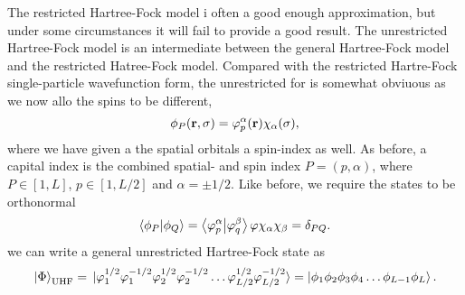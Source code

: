 The restricted Hartree-Fock model i often a good enough approximation, but under some 
circumstances it will fail to provide a good result. The unrestricted Hartree-Fock model 
is an intermediate between the general Hartree-Fock model and the restricted Hatree-Fock 
model. Compared with the restricted Hartre-Fock single-particle wavefunction form, the 
unrestricted for is somewhat obviuous as we now allo the spins to be different,
\begin{equation}
    \phi_P(\vb{r}, \sigma) = \varphi_p^{\alpha}(\vb{r})\chi_\alpha(\sigma),
\end{equation}
where we have given a the spatial orbitals a spin-index as well. As before, a capital index 
is the combined spatial- and spin index $P=(p,\alpha)$, where $P \in [1,L]$, $p\in [1, L/2]$
and $\alpha = \pm 1/2$. 
Like before, we require the states to be orthonormal 
\begin{equation}
    \braket{\phi_P}{\phi_Q} 
    = \braket{\varphi^\alpha_p}{\varphi^\beta_q}\varphi{\chi_\alpha}{\chi_\beta}
    = \delta_{PQ}.
\end{equation}
we can write a general unrestricted Hartree-Fock state as 
\begin{equation}
    \ket{\Phi}_{\text{UHF}}
        =
        \ket*{\varphi_1^{1/2} \varphi_1^{-1/2} \varphi_2^{1/2} \varphi_2^{-1/2}
            \dots \varphi_{L/2}^{1/2} \varphi_{L/2}^{-1/2}}
        =
        \ket{\phi_1\phi_2\phi_3\phi_4 \dots \phi_{L-1} \phi_L}.
\end{equation}

